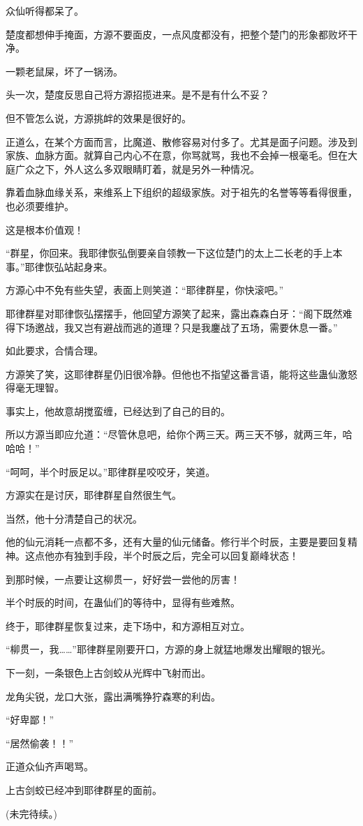 \begin{this_body}
众仙听得都呆了。

楚度都想伸手掩面，方源不要面皮，一点风度都没有，把整个楚门的形象都败坏干净。

一颗老鼠屎，坏了一锅汤。

头一次，楚度反思自己将方源招揽进来。是不是有什么不妥？

但不管怎么说，方源挑衅的效果是很好的。

正道么，在某个方面而言，比魔道、散修容易对付多了。尤其是面子问题。涉及到家族、血脉方面。就算自己内心不在意，你骂就骂，我也不会掉一根毫毛。但在大庭广众之下，外人这么多双眼睛盯着，就是另外一种情况。

靠着血脉血缘关系，来维系上下组织的超级家族。对于祖先的名誉等等看得很重，也必须要维护。

这是根本价值观！

“群星，你回来。我耶律恢弘倒要亲自领教一下这位楚门的太上二长老的手上本事。”耶律恢弘站起身来。

方源心中不免有些失望，表面上则笑道：“耶律群星，你快滚吧。”

耶律群星对耶律恢弘摆摆手，他回望方源笑了起来，露出森森白牙：“阁下既然难得下场邀战，我又岂有避战而逃的道理？只是我鏖战了五场，需要休息一番。”

如此要求，合情合理。

方源笑了笑，这耶律群星仍旧很冷静。但他也不指望这番言语，能将这些蛊仙激怒得毫无理智。

事实上，他故意胡搅蛮缠，已经达到了自己的目的。

所以方源当即应允道：“尽管休息吧，给你个两三天。两三天不够，就两三年，哈哈哈！”

“呵呵，半个时辰足以。”耶律群星咬咬牙，笑道。

方源实在是讨厌，耶律群星自然很生气。

当然，他十分清楚自己的状况。

他的仙元消耗一点都不多，还有大量的仙元储备。修行半个时辰，主要是要回复精神。这点他亦有独到手段，半个时辰之后，完全可以回复巅峰状态！

到那时候，一点要让这柳贯一，好好尝一尝他的厉害！

半个时辰的时间，在蛊仙们的等待中，显得有些难熬。

终于，耶律群星恢复过来，走下场中，和方源相互对立。

“柳贯一，我……”耶律群星刚要开口，方源的身上就猛地爆发出耀眼的银光。

下一刻，一条银色上古剑蛟从光辉中飞射而出。

龙角尖锐，龙口大张，露出满嘴狰狞森寒的利齿。

“好卑鄙！”

“居然偷袭！！”

正道众仙齐声喝骂。

上古剑蛟已经冲到耶律群星的面前。

(未完待续。)

\end{this_body}

